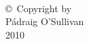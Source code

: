 
\thispagestyle{empty}
\hbox{\ }

\vfill
\renewcommand{\baselinestretch}{1}
\small\normalsize

\vspace{-.65in}

\begin{center}
\large{\copyright \hbox{ }Copyright by\\
P\'{a}draig O'Sullivan %
\\
2010}
\end{center}

\vfill
